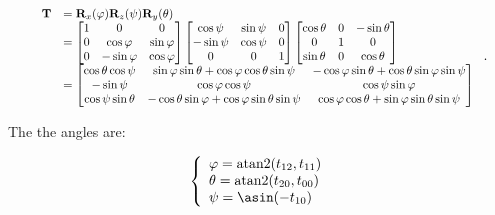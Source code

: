     \begin{equation}
        \scalebox{0.85}{
            $ \begin{array}{ll}
                \mathbf{T}
                &= \mathbf{R}_{x}(\varphi)\mathbf{R}_{z}(\psi)\mathbf{R}_{y}(\theta) \\
                &=
                \begin{bmatrix}
                    1 & 0 & 0 \\
                    0 & \cos \varphi & \sin \varphi \\
                    0 & -\sin \varphi & \cos \varphi
                \end{bmatrix}
                \begin{bmatrix}
                    \cos \psi & \sin \psi & 0 \\
                    -\sin \psi & \cos \psi & 0 \\
                    0 & 0 & 1
                \end{bmatrix}
                \begin{bmatrix}
                    \cos \theta & 0 & -\sin \theta \\
                    0 & 1 & 0 \\
                    \sin \theta & 0 & \cos \theta
                \end{bmatrix} \\
                &=
                \begin{bmatrix}
                    \cos \theta \cos \psi
                    &  \sin \varphi \sin \theta + \cos \varphi \cos \theta \sin \psi
                    & -\cos \varphi \sin \theta + \cos \theta \sin \varphi \sin \psi \\
                    -\sin \psi
                    & \cos \varphi \cos \psi
                    & \cos \psi \sin \varphi \\
                    \cos \psi \sin \theta
                    & -\cos \theta \sin \varphi + \cos \varphi \sin \theta \sin \psi
                    & \cos \varphi \cos \theta + \sin \varphi \sin \theta \sin \psi
                \end{bmatrix}
            \end{array} $
        }
    .\end{equation}

    The the angles are:

    \begin{equation}
        \left\{ \begin{array}{l}
            \varphi = \atantwo(t_{12}, t_{11}) \\
            \theta = \atantwo(t_{20}, t_{00}) \\
            \psi = \asin(-t_{10})
        \end{array} \right.
    \end{equation}

